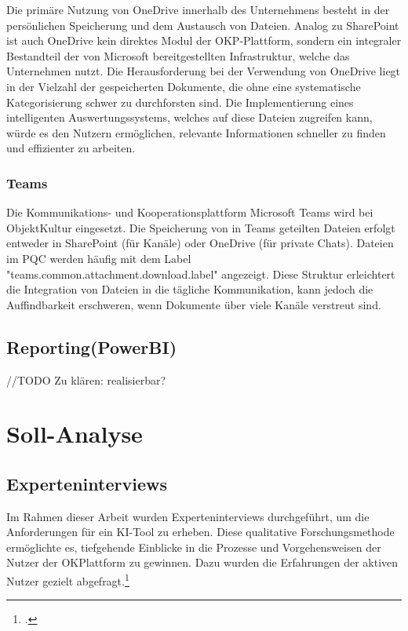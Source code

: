 Die primäre Nutzung von OneDrive innerhalb des Unternehmens besteht in der persönlichen Speicherung und dem Austausch von Dateien. Analog zu SharePoint ist auch OneDrive kein direktes Modul der OKP-Plattform, sondern ein integraler Bestandteil der von Microsoft bereitgestellten Infrastruktur, welche das Unternehmen nutzt. Die Herausforderung bei der Verwendung von OneDrive liegt in der Vielzahl der gespeicherten Dokumente, die ohne eine systematische Kategorisierung schwer zu durchforsten sind. Die Implementierung eines intelligenten Auswertungssystems, welches auf diese Dateien zugreifen kann, würde es den Nutzern ermöglichen, relevante Informationen schneller zu finden und effizienter zu arbeiten.

\subsubsection{Teams}

Die Kommunikations- und Kooperationsplattform Microsoft Teams wird bei ObjektKultur eingesetzt. Die Speicherung von in Teams geteilten Dateien erfolgt entweder in SharePoint (für Kanäle) oder OneDrive (für private Chats). Dateien im PQC werden häufig mit dem Label "teams.common.attachment.download.label" angezeigt. Diese Struktur erleichtert die Integration von Dateien in die tägliche Kommunikation, kann jedoch die Auffindbarkeit erschweren, wenn Dokumente über viele Kanäle verstreut sind. 

\subsection{Reporting(PowerBI)}

//TODO
Zu klären: realisierbar?

\section{Soll-Analyse}

\subsection{Experteninterviews}

Im Rahmen dieser Arbeit wurden Experteninterviews durchgeführt, um die Anforderungen für ein KI-Tool zu erheben. Diese qualitative Forschungsmethode ermöglichte es, tiefgehende Einblicke in die Prozesse und Vorgehensweisen der Nutzer der OKPlattform zu gewinnen. Dazu wurden die Erfahrungen der aktiven Nutzer gezielt abgefragt.\footcite[4]{wernitz_experteninterview_2018}

